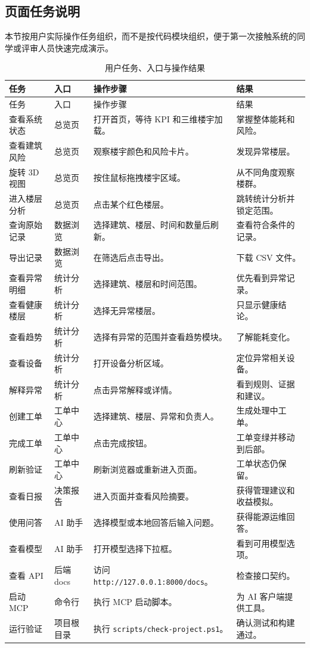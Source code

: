 \documentclass[12pt,a4paper]{ctexart}
\newcommand{\code}[1]{{\footnotesize\nolinkurl{#1}}}
\begin{document}
\subsection{页面任务说明}
本节按用户实际操作任务组织，而不是按代码模块组织，便于第一次接触系统的同学或评审人员快速完成演示。
\begin{longtable}{L{2.4cm}L{3.2cm}L{5.8cm}L{3.8cm}}
\caption{用户任务、入口与操作结果}\\
\toprule
任务 & 入口 & 操作步骤 & 结果 \\
\midrule
\endfirsthead
\toprule
任务 & 入口 & 操作步骤 & 结果 \\
\midrule
\endhead
查看系统状态 & 总览页 & 打开首页，等待 KPI 和三维楼宇加载。 & 掌握整体能耗和风险。 \\
查看建筑风险 & 总览页 & 观察楼宇颜色和风险卡片。 & 发现异常楼层。 \\
旋转 3D 视图 & 总览页 & 按住鼠标拖拽楼宇区域。 & 从不同角度观察楼群。 \\
进入楼层分析 & 总览页 & 点击某个红色楼层。 & 跳转统计分析并锁定范围。 \\
查询原始记录 & 数据浏览 & 选择建筑、楼层、时间和数量后刷新。 & 查看符合条件的记录。 \\
导出记录 & 数据浏览 & 在筛选后点击导出。 & 下载 CSV 文件。 \\
查看异常明细 & 统计分析 & 选择建筑、楼层和时间范围。 & 优先看到异常记录。 \\
查看健康楼层 & 统计分析 & 选择无异常楼层。 & 只显示健康结论。 \\
查看趋势 & 统计分析 & 选择有异常的范围并查看趋势模块。 & 了解能耗变化。 \\
查看设备 & 统计分析 & 打开设备分析区域。 & 定位异常相关设备。 \\
解释异常 & 统计分析 & 点击异常解释或详情。 & 看到规则、证据和建议。 \\
创建工单 & 工单中心 & 选择建筑、楼层、异常和负责人。 & 生成处理中工单。 \\
完成工单 & 工单中心 & 点击完成按钮。 & 工单变绿并移动到后部。 \\
刷新验证 & 工单中心 & 刷新浏览器或重新进入页面。 & 工单状态仍保留。 \\
查看日报 & 决策报告 & 进入页面并查看风险摘要。 & 获得管理建议和收益模拟。 \\
使用问答 & AI 助手 & 选择模型或本地回答后输入问题。 & 获得能源运维回答。 \\
查看模型 & AI 助手 & 打开模型选择下拉框。 & 看到可用模型选项。 \\
查看 API & 后端 docs & 访问 \code{http://127.0.0.1:8000/docs}。 & 检查接口契约。 \\
启动 MCP & 命令行 & 执行 MCP 启动脚本。 & 为 AI 客户端提供工具。 \\
运行验证 & 项目根目录 & 执行 \code{scripts/check-project.ps1}。 & 确认测试和构建通过。 \\
\bottomrule
\end{longtable}
\end{document}
